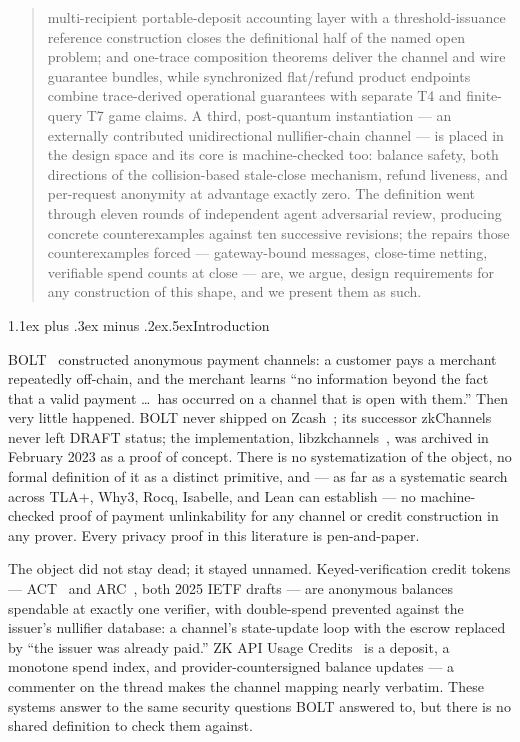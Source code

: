 \documentclass[9pt]{extarticle}
\makeatletter
\renewcommand\section{\@startsection{section}{1}{0pt}%
  {1.1ex plus .3ex minus .2ex}{.5ex}{\normalfont\Large\bfseries}}
\makeatother
\begin{document}
\begin{abstract}
multi-recipient portable-deposit accounting layer with a threshold-issuance
reference construction closes the definitional half of the named open
problem; and one-trace composition theorems deliver the channel and wire
guarantee bundles, while synchronized flat/refund product endpoints combine
trace-derived operational guarantees with separate T4 and finite-query T7
game claims. A third,
post-quantum instantiation --- an externally contributed unidirectional nullifier-chain
channel --- is placed in the design space and its core is machine-checked
too: balance safety, both directions of the collision-based stale-close
mechanism, refund liveness, and per-request anonymity at advantage exactly
zero. The definition went through eleven rounds of
independent agent adversarial review, producing concrete counterexamples against
ten successive revisions; the repairs those
counterexamples forced --- gateway-bound messages, close-time netting,
verifiable spend counts at close --- are, we argue, design requirements for
any construction of this shape, and we present them as such.
\end{abstract}

\section{Introduction}

BOLT~\cite{greenmiers2017bolt} constructed anonymous payment channels: a
customer pays a merchant repeatedly off-chain, and the merchant learns
``no information beyond the fact that a valid payment \ldots\ has occurred
on a channel that is open with them.'' Then very little happened. BOLT
never shipped on Zcash~\cite{eccbolt2016}; its successor
zkChannels~\cite{zkchannels2021} never left DRAFT status; the
implementation, libzkchannels~\cite{libzkchannels}, was archived in
February 2023 as a proof of concept. There is no systematization of the
object, no formal definition of it as a distinct primitive, and --- as far
as a systematic search across TLA+, Why3, Rocq, Isabelle, and Lean can
establish --- no machine-checked proof of payment unlinkability for any
channel or credit construction in any prover. Every privacy proof in this
literature is pen-and-paper.

The object did not stay dead; it stayed unnamed. Keyed-verification credit
tokens --- ACT~\cite{act2025} and ARC~\cite{arc2025}, both 2025 IETF
drafts --- are anonymous balances spendable at exactly one verifier, with
double-spend prevented against the issuer's nullifier database: a
channel's state-update loop with the escrow replaced by ``the issuer was
already paid.'' ZK API Usage Credits~\cite{crapisbuterin2026credits} is a
deposit, a monotone spend index, and provider-countersigned balance
updates --- a commenter on the thread makes the channel mapping nearly
verbatim. These systems answer to the same security questions BOLT
answered to, but there is no shared definition to check them against.
\end{document}
